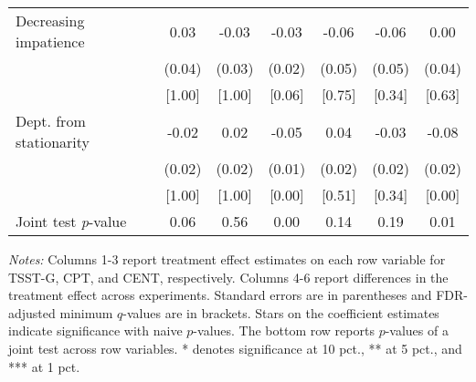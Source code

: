 \begin{table}[htbp]
{\begin{threeparttable}
\begin{tabular}{l*{6}{c}}
Decreasing impatience&     0.03&    -0.03&    -0.03&    -0.06&    -0.06&     0.00\\
          &   (0.04)&   (0.03)&   (0.02)&   (0.05)&   (0.05)&   (0.04)\\
          &   [1.00]&   [1.00]&[0.06\sym{*}]&   [0.75]&   [0.34]&   [0.63]\\
Dept. from stationarity&    -0.02&     0.02&-0.05\sym{***}&0.04\sym{*}&    -0.03&-0.08\sym{***}\\
          &   (0.02)&   (0.02)&   (0.01)&   (0.02)&   (0.02)&   (0.02)\\
          &   [1.00]&   [1.00]&[0.00\sym{***}]&   [0.51]&   [0.34]&[0.00\sym{***}]\\
\midrule Joint test \emph{p}-value&0.06\sym{*}&     0.56&0.00\sym{***}&     0.14&     0.19&0.01\sym{**}\\
\bottomrule \end{tabular} \begin{tablenotes}[flushleft] \footnotesize \item \emph{Notes:} Columns 1-3 report treatment effect estimates on each row variable for TSST-G, CPT, and CENT, respectively. Columns 4-6 report differences in the treatment effect across experiments. Standard errors are in parentheses and FDR-adjusted minimum \(q\)-values are in brackets. Stars on the coefficient estimates indicate significance with naive \(p\)-values. The bottom row reports \(p\)-values of a joint test across row variables. * denotes significance at 10 pct., ** at 5 pct., and *** at 1 pct. \end{tablenotes} \end{threeparttable} } \end{table}
